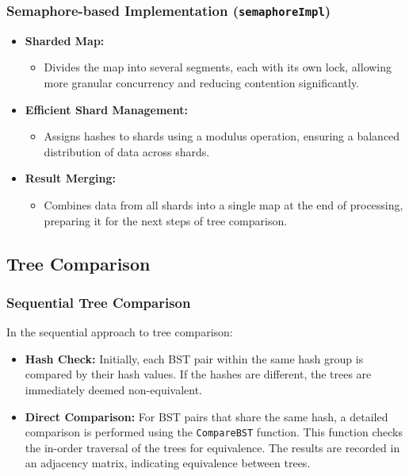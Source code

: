 \documentclass[letterpaper,12pt]{article}
\theoremstyle{remark}
\begin{document}
\subsubsection*{Semaphore-based Implementation (\texttt{semaphoreImpl})}
\begin{itemize}
    \item \textbf{Sharded Map:}
    \begin{itemize}
        \item Divides the map into several segments, each with its own lock, allowing more granular concurrency and reducing contention significantly.
    \end{itemize}
    
    \item \textbf{Efficient Shard Management:}
    \begin{itemize}
        \item Assigns hashes to shards using a modulus operation, ensuring a balanced distribution of data across shards.
    \end{itemize}
    
    \item \textbf{Result Merging:}
    \begin{itemize}
        \item Combines data from all shards into a single map at the end of processing, preparing it for the next steps of tree comparison.
    \end{itemize}
\end{itemize}


\subsection{Tree Comparison}



\subsubsection{Sequential Tree Comparison}
In the sequential approach to tree comparison:
\begin{itemize}
    \item \textbf{Hash Check:} Initially, each BST pair within the same hash group is compared by their hash values. If the hashes are different, the trees are immediately deemed non-equivalent.
    \item \textbf{Direct Comparison:} For BST pairs that share the same hash, a detailed comparison is performed using the \texttt{CompareBST} function. This function checks the in-order traversal of the trees for equivalence. The results are recorded in an adjacency matrix, indicating equivalence between trees.
\end{itemize}
\end{document}
